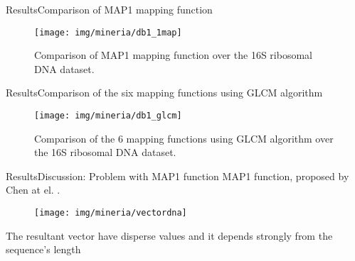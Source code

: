 \documentclass[10pt]{beamer}
\newcommand{\1}{
	\setbeamertemplate{background}{
		\texttt{[image: img/1]}
		\tikz[overlay] \fill[fill opacity=0.75,fill=white] (0,0) rectangle (-\paperwidth,\paperheight);
	}
}
\begin{document}
\begin{frame}{Results}{Comparison of MAP1 mapping function}
	\begin{figure}[]
		\centering
		\texttt{[image: img/mineria/db1\_1map]}
		\caption{Comparison of MAP1 mapping function over the 16S ribosomal DNA dataset.}
		\label{img:comp3}
	\end{figure}
\end{frame}

\begin{frame}{Results}{Comparison of the six mapping functions using GLCM algorithm}
	\begin{figure}[]
		\centering
		\texttt{[image: img/mineria/db1\_glcm]}
		\caption{Comparison of the 6 mapping functions using GLCM algorithm over the 16S ribosomal DNA dataset.}
		\label{img:comp3}
	\end{figure}
\end{frame}


\begin{frame}{Results}{Discussion: Problem with MAP1 function}
	MAP1 function, proposed by Chen at el. \cite{chen2018use}.
	
	
	
			\begin{figure}[]
				\centering
				\texttt{[image: img/mineria/vectordna]}		
			\end{figure}
		
	

	\begin{block}{}
	The resultant vector have disperse values and it depends strongly from the sequence's length
	\end{block}
\end{frame}
\end{document}
